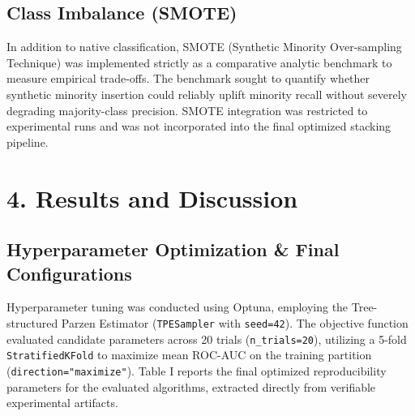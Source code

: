 \documentclass[conference]{IEEEtran}
\begin{document}
\subsection{Class Imbalance (SMOTE)}
In addition to native classification, SMOTE (Synthetic Minority Over-sampling Technique) was implemented strictly as a comparative analytic benchmark to measure empirical trade-offs. The benchmark sought to quantify whether synthetic minority insertion could reliably uplift minority recall without severely degrading majority-class precision. SMOTE integration was restricted to experimental runs and was not incorporated into the final optimized stacking pipeline.


\section{4. Results and Discussion}


\subsection{Hyperparameter Optimization \& Final Configurations}
Hyperparameter tuning was conducted using Optuna, employing the Tree-structured Parzen Estimator (\texttt{TPESampler} with \texttt{seed=42}). The objective function evaluated candidate parameters across 20 trials (\texttt{n\_trials=20}), utilizing a 5-fold \texttt{StratifiedKFold} to maximize mean ROC-AUC on the training partition (\texttt{direction="maximize"}). Table I reports the final optimized reproducibility parameters for the evaluated algorithms, extracted directly from verifiable experimental artifacts.
\end{document}
